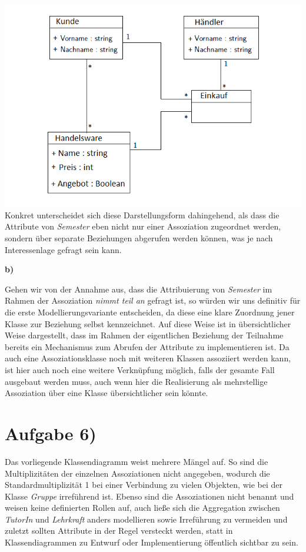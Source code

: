 \documentclass{swp1}
\begin{document}
\newline
\includegraphics[scale=0.5]{Mehrteilige_Assoziation}
\newline
Konkret unterscheidet sich diese Darstellungsform dahingehend, als dass die Attribute von \emph{Semester} eben nicht nur einer Assoziation zugeordnet werden, sondern über separate Beziehungen abgerufen werden können, was je nach Interessenlage gefragt sein kann.\newline

\textbf{b)}\newline

Gehen wir von der Annahme aus, dass die Attribuierung von \emph{Semester} im Rahmen der Assoziation \emph{nimmt teil an} gefragt ist, so würden wir uns definitiv für die erste Modellierungsvariante entscheiden, da diese eine klare Zuordnung jener Klasse zur Beziehung selbst kennzeichnet. Auf diese Weise ist in übersichtlicher Weise dargestellt, dass im Rahmen der eigentlichen Beziehung der Teilnahme bereits ein Mechanismus zum Abrufen der Attribute zu implementieren ist.\newline
Da auch eine Assoziationsklasse noch mit weiteren Klassen assoziiert werden kann, ist hier auch noch eine weitere Verknüpfung möglich, falls der gesamte Fall ausgebaut werden muss, auch wenn hier die Realisierung als mehrstellige Assoziation über eine Klasse übersichtlicher sein könnte.

\section*{Aufgabe 6)}

Das vorliegende Klassendiagramm weist mehrere Mängel auf. So sind die Multiplizitäten der einzelnen Assoziationen nicht angegeben, wodurch die Standardmultiplizität 1 bei einer Verbindung zu vielen Objekten, wie bei der Klasse \emph{Gruppe} irreführend ist. Ebenso sind die Assoziationen nicht benannt und weisen keine definierten Rollen auf, auch ließe sich die Aggregation zwischen \emph{TutorIn} und \emph{Lehrkraft} anders modellieren sowie Irreführung zu vermeiden und zuletzt sollten Attribute in der Regel versteckt werden, statt in Klassendiagrammen zu Entwurf oder Implementierung öffentlich sichtbar zu sein.
\end{document}
